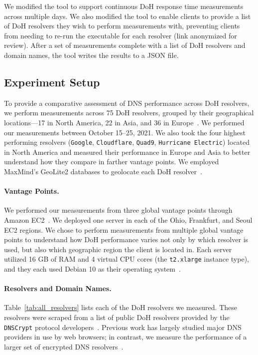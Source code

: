 We modified the tool to support continuous DoH response time measurements
across multiple days.  We also modified the tool to enable clients to provide
a list of DoH resolvers they wish to perform measurements with, preventing
clients from needing to re-run the executable for each resolver (link
anonymized for review).  After a set of measurements complete with a list of
DoH resolvers and domain names, the tool writes the results to a JSON file.

\subsection{Experiment Setup} To provide a comparative assessment of DNS
performance across DoH resolvers, we perform measurements across 75 DoH
resolvers, grouped by their geographical locations—17 in North America, 22 in
Asia, and 36 in Europe~\cite{dnscrypt}.  We performed our measurements between
October 15--25, 2021.  We also took the four highest
performing resolvers (\texttt{Google}, \texttt{Cloudflare}, \texttt{Quad9},
\texttt{Hurricane Electric}) located in North America and measured their
performance in Europe and Asia to better understand how they compare in
farther vantage points.  We employed MaxMind's GeoLite2 databases to geolocate
each DoH resolver~\cite{maxmind}.

\paragraph{Vantage Points.} We performed our measurements from three global
vantage points through Amazon EC2~\cite{amazon_ec2}.  We deployed one server
in each of the Ohio, Frankfurt, and Seoul EC2 regions.  We chose to perform
measurements from multiple global vantage points to understand how DoH
performance varies not only by which resolver is used, but also which
geographic region the client is located in.  Each server utilized 16 GB of RAM
and 4 virtual CPU cores (the \texttt{t2.xlarge} instance type), and they each
used Debian 10 as their operating system~\cite{amazon_ec2_instance_types}.

\paragraph{Resolvers and Domain Names.} Table~\ref{tab:all_resolvers} 
lists each of the DoH resolvers we measured.  These resolvers were
scraped from a list of public DoH resolvers provided by the \texttt{DNSCrypt}
protocol developers~\cite{dnscrypt-public-resolvers}.  Previous work has
largely studied major DNS providers in use by web browsers; in contrast, we
measure the performance of a larger set of encrypted DNS
resolvers~\cite{hounsel2020comparing,borgolte2019dns}.

